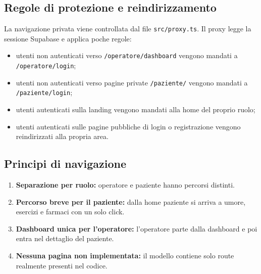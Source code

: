 \subsection{Regole di protezione e reindirizzamento}

La navigazione privata viene controllata dal file \texttt{src/proxy.ts}. Il proxy legge la sessione Supabase e applica poche regole:

\begin{itemize}
    \item utenti non autenticati verso \texttt{/operatore/dashboard} vengono mandati a \texttt{/operatore/login};
    \item utenti non autenticati verso pagine private \texttt{/paziente/} vengono mandati a \texttt{/paziente/login};
    \item utenti autenticati sulla landing vengono mandati alla home del proprio ruolo;
    \item utenti autenticati sulle pagine pubbliche di login o registrazione vengono reindirizzati alla propria area.
\end{itemize}

\subsection{Principi di navigazione}

\begin{enumerate}
    \item \textbf{Separazione per ruolo:} operatore e paziente hanno percorsi distinti.
    \item \textbf{Percorso breve per il paziente:} dalla home paziente si arriva a umore, esercizi e farmaci con un solo click.
    \item \textbf{Dashboard unica per l'operatore:} l'operatore parte dalla dashboard e poi entra nel dettaglio del paziente.
    \item \textbf{Nessuna pagina non implementata:} il modello contiene solo route realmente presenti nel codice.
\end{enumerate}

\newpage
